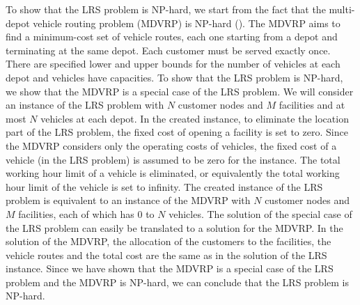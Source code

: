 To show that the LRS problem is NP-hard, we start from the fact that the
multi-depot vehicle routing problem (MDVRP) is NP-hard (\citet{Bodin2,Lenstra}). 
The MDVRP aims to find a minimum-cost set of vehicle routes, each one starting from a
depot and terminating at the same depot. Each customer must be served exactly once. 
There are specified lower and upper bounds for the number of vehicles at each depot
and vehicles have capacities. To show that the LRS problem is NP-hard, we show that the 
MDVRP is a special case of the LRS problem.  We will consider an instance of the LRS 
problem with $N$ customer nodes and $M$ facilities and at most $N$ vehicles at 
each depot. In the created instance, to eliminate the location part of the LRS problem, 
the fixed cost of opening a facility is set to zero. Since the MDVRP considers only the 
operating costs of vehicles, the fixed cost of a vehicle (in the LRS problem) is assumed 
to be zero for the instance. 
The total working hour limit of a vehicle is 
eliminated, or equivalently the total working hour limit of the vehicle is set to infinity.
The created instance of the  LRS problem is equivalent to an instance of the MDVRP 
with $N$ customer nodes and $M$ facilities, each of which has $0$ to $N$ vehicles.
The solution of the special case of the LRS problem can easily be translated to
a solution for the MDVRP. In the solution of the MDVRP, the allocation of the 
customers to the facilities, the vehicle routes and the total cost are the same as in 
the solution of the LRS instance. 
Since we have shown that the MDVRP is a special case of the LRS 
problem and the MDVRP is NP-hard, we can conclude that the LRS problem is NP-hard. 
 
 

